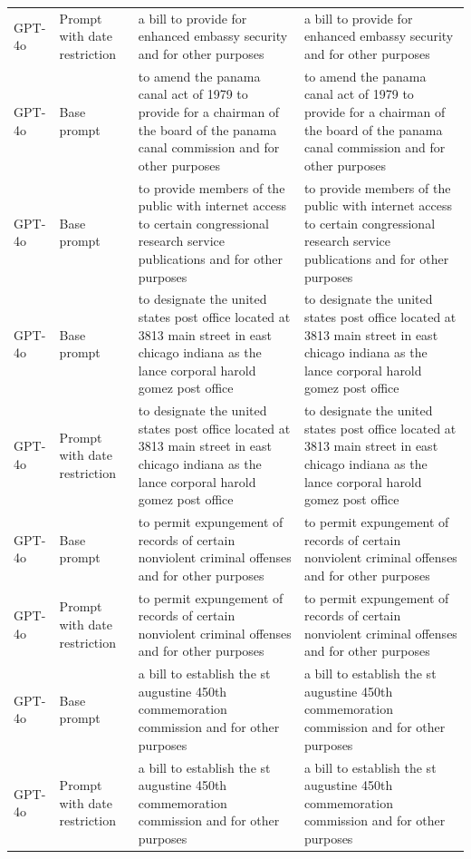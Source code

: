 \begin{longtable}{>{\raggedright\arraybackslash}p{1.4cm}>{\raggedright\arraybackslash}p{1.4cm}>{\raggedright\arraybackslash}p{5.5cm}>{\raggedright\arraybackslash}p{5.5cm}}
GPT-4o & Prompt with date restriction & a bill to provide for enhanced embassy security and for other purposes & a bill to provide for enhanced embassy security and for other purposes\\
GPT-4o & Base prompt & to amend the panama canal act of 1979 to provide for a chairman of the board of the panama canal commission and for other purposes & to amend the panama canal act of 1979 to provide for a chairman of the board of the panama canal commission and for other purposes\\
GPT-4o & Base prompt & to provide members of the public with internet access to certain congressional research service publications and for other purposes & to provide members of the public with internet access to certain congressional research service publications and for other purposes\\
GPT-4o & Base prompt & to designate the united states post office located at 3813 main street in east chicago indiana as the lance corporal harold gomez post office & to designate the united states post office located at 3813 main street in east chicago indiana as the lance corporal harold gomez post office\\
GPT-4o & Prompt with date restriction & to designate the united states post office located at 3813 main street in east chicago indiana as the lance corporal harold gomez post office & to designate the united states post office located at 3813 main street in east chicago indiana as the lance corporal harold gomez post office\\
GPT-4o & Base prompt & to permit expungement of records of certain nonviolent criminal offenses and for other purposes & to permit expungement of records of certain nonviolent criminal offenses and for other purposes\\
GPT-4o & Prompt with date restriction & to permit expungement of records of certain nonviolent criminal offenses and for other purposes & to permit expungement of records of certain nonviolent criminal offenses and for other purposes\\
GPT-4o & Base prompt & a bill to establish the st augustine 450th commemoration commission and for other purposes & a bill to establish the st augustine 450th commemoration commission and for other purposes\\
GPT-4o & Prompt with date restriction & a bill to establish the st augustine 450th commemoration commission and for other purposes & a bill to establish the st augustine 450th commemoration commission and for other purposes\\

\end{longtable}
